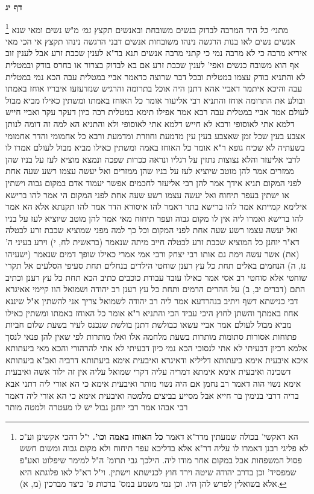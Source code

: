\documentclass[12pt, openany]{book}
\newcommand{\sethebfont}{
\fontsize{10.5pt}{21.0pt} \selectfont
}
\newcommand{\twocol}[1]{
	{\sethebfont \begin{multicols}{2}
			#1
	\end{multicols}}	
}
\newcommand{\sectname}{}
\newcommand{\newsection}[1]{
	\addcontentsline{toc}{section}{#1}
	\renewcommand{\sectname}{#1}	
	\vspace{-\baselineskip}
	\begin{center}
		\textbf{%
\fontsize{16pt}{16pt}\selectfont
			#1}
	\end{center}
	\vspace{-\baselineskip}
	\nopagebreak
}
\newcommand{\footnotecomment}[1]{
	\renewcommand\thefootnote{}
	\footnote{#1}}
\newcommand{\commenta}[1]{\footnotecomment{#1}}
\begin{document}
\newsection{דף יג}
\twocol{
\commenta{הא דאקשי' בכולה שמעתין מדר"א דאמר \textbf{כל האוחז באמה וכו'.} י"ל דהכי אקשינן וע"כ לא פליגי רבנן דאמרו לו עליה דר"א אלא בדליכא עפר תיחוח ולא מקום גבוה ומשום חשש פסול המשפחות אבל במקום אחר מודו ליה. הילכך גבי תרומ' ה"ל למימר שיפלוט ואע"פ שמפסיד' וכן בדרב יהודה שיטה וירד חוץ לכנישתא וישתין. וי"ל דא"ל לאו פלוגתא היא אלא בשואלין לפרש להן היו. וכן נמי משמע במס' ברכות פ' כיצד מברכין (מ, א). }
מתני׳ {\large\emph{כל}} היד המרבה לבדוק בנשים משובחת ובאנשים תקצץ
{\large\emph{גמ׳}} מ"ש נשים ומאי שנא אנשים נשים לאו בנות הרגשה נינהו משובחות אנשים דבני הרגשה נינהו תקצץ 
אי הכי מאי איריא מרבה כי לא מרבה נמי כי קתני מרבה אנשים 
תנא בד"א לענין שכבת זרע אבל לענין זוב אף הוא משובח כנשים 
ואפי' לענין שכבת זרע אם בא לבדוק בצרור או בחרס בודק 
ובמטלית לא והתניא בודק עצמו במטלית ובכל דבר שרוצה כדאמר אביי במטלית עבה הכא נמי במטלית עבה 
והיכא איתמר דאביי אהא דתנן היה אוכל בתרומה והרגיש שנזדעזעו איבריו אוחז באמתו ובולע את התרומה 
אוחז והתניא רבי אליעזר אומר כל האוחז באמתו ומשתין כאילו מביא מבול לעולם אמר אביי במטלית עבה 
רבא אמר אפילו תימא במטלית רכה כיון דעקר עקר ואביי חייש דלמא אתי לאוסופי ורבא לא חייש דלמא אתי לאוסופי
 ולא והתניא הא למה זה דומה לנותן אצבע בעין שכל זמן שאצבע בעין עין מדמעת וחוזרת ומדמעת 
ורבא כל אחמומי והדר אחמומי בשעתיה לא שכיח 
גופא ר"א אומר כל האוחז באמה ומשתין כאילו מביא מבול לעולם אמרו לו לרבי אליעזר והלא נצוצות נתזין על רגליו ונראה ככרות שפכה ונמצא מוציא לעז על בניו שהן ממזרים 
אמר להן מוטב שיוציא לעז על בניו שהן ממזרים ואל יעשה עצמו רשע שעה אחת לפני המקום 
תניא אידך אמר להן רבי אליעזר לחכמים אפשר יעמוד אדם במקום גבוה וישתין או ישתין בעפר תיחוח ואל יעשה עצמו רשע שעה אחת לפני המקום 
הי אמר להו ברישא אילימא קמייתא אמר להו ברישא בתר דאמר להו איסורא הדר אמר להו תקנתא 
אלא הא אמר להו ברישא ואמרו ליה אין לו מקום גבוה ועפר תיחוח מאי אמר להן מוטב שיוציא לעז על בניו ואל יעשה עצמו רשע שעה אחת לפני המקום
וכל כך למה מפני שמוציא שכבת זרע לבטלה דא"ר יוחנן כל המוציא שכבת זרע לבטלה חייב מיתה שנאמר (בראשית לח, י) וירע בעיני ה' (את) אשר עשה וימת גם אותו 
רבי יצחק ורבי אמי אמרי כאילו שופך דמים שנאמר (ישעיהו נז, ה) הנחמים באלים תחת כל עץ רענן שוחטי הילדים בנחלים תחת סעיפי הסלעים אל תקרי שוחטי אלא סוחטי 
רב אסי אמר כאילו עובד עבודת כוכבים כתיב הכא תחת כל עץ רענן וכתיב התם (דברים יב, ב) על ההרים הרמים ותחת כל עץ רענן 
רב יהודה ושמואל הוו קיימי אאיגרא דבי כנישתא דשף ויתיב בנהרדעא אמר ליה רב יהודה לשמואל צריך אני להשתין א"ל שיננא אחוז באמתך והשתן לחוץ 
היכי עביד הכי והתניא ר"א אומר כל האוחז באמתו ומשתין כאילו מביא מבול לעולם 
אמר אביי עשאו כבולשת דתנן בולשת שנכנס לעיר בשעת שלום חביות פתוחות אסורות סתומות מותרות בשעת מלחמה אלו ואלו מותרות לפי שאין להן פנאי לנסך אלמא דכיון דבעיתי לא אתי לנסוכי הכא נמי כיון דבעיתי לא אתי להרהורי 
והכא מאי ביעתותא איכא איבעית אימא ביעתותא דליליא ודאיגרא ואיבעית אימא ביעתותא דרביה ואב"א ביעתותא דשכינה ואיבעית אימא אימתא דמריה עליה דקרי שמואל עליה אין זה ילוד אשה 
ואיבעית אימא נשוי הוה דאמר רב נחמן אם היה נשוי מותר 
ואיבעית אימא כי הא אורי ליה דתני אבא בריה דרבי בנימין בר חייא אבל מסייע בביצים מלמטה ואיבעית אימא כי הא אורי ליה דאמר רבי אבהו אמר רבי יוחנן גבול יש לו מעטרה ולמטה מותר}
\end{document}
